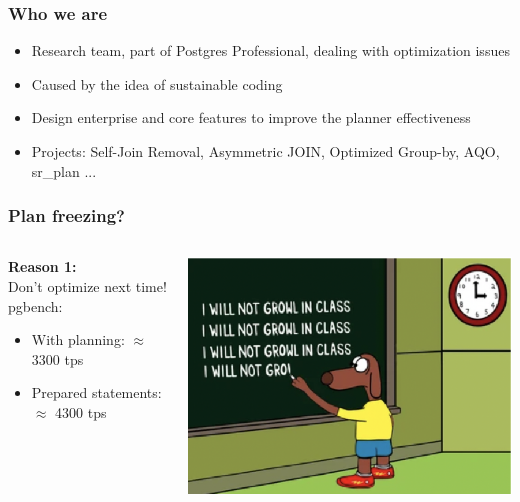 \documentclass{beamer}
\begin{document}
\begin{frame}[fragile]\frametitle{Who we are}
\begin{itemize}
  \item Research team, part of Postgres Professional, dealing with optimization issues
  \item Caused by the idea of sustainable coding
  \item Design enterprise and core features to improve the planner effectiveness
  \item Projects: Self-Join Removal, Asymmetric JOIN, Optimized Group-by, AQO, sr\_plan ...

\end{itemize}
\end{frame}

\begin{frame}[fragile]\frametitle{Plan freezing?}
\begin{columns}\begin{column}{0.6\textwidth}
\textbf{Reason 1:} \\
Don't optimize next time! \\
\bigskip
pgbench:
\begin{itemize}
  \item With planning: $\approx$ 3300 tps
  \item Prepared statements: $\approx$ 4300 tps
\end{itemize}
\end{column}
\begin{column}{0.4\textwidth}
  \includegraphics[scale=0.7]{chalkboardlines}
\end{column}\end{columns}
\end{frame}
\end{document}
